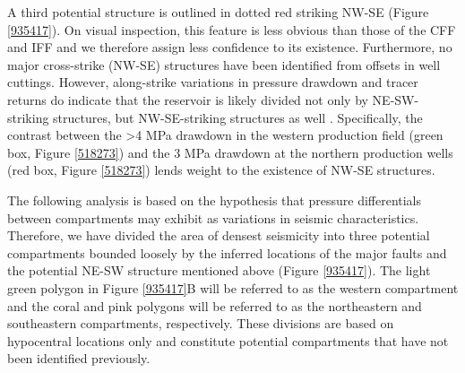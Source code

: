 A third potential structure is outlined in dotted red striking NW-SE (Figure \ref{935417}). On visual inspection, this feature is less obvious than those of the CFF and IFF and we therefore assign less confidence to its existence. Furthermore, no major cross-strike (NW-SE) structures have been identified from offsets in well cuttings. However, along-strike variations in pressure drawdown and tracer returns do indicate that the reservoir is likely divided not only by NE-SW-striking structures, but NW-SE-striking structures as well \citep{Sewell_2015,Quinao_2013stanford}. Specifically, the contrast between the \textgreater4 MPa drawdown in the western production field (green box, Figure \ref{518273}) and the 3 MPa drawdown at the northern production wells (red box, Figure \ref{518273}) lends weight to the existence of NW-SE structures.

The following analysis is based on the hypothesis that pressure differentials between compartments may exhibit as variations in seismic characteristics. Therefore, we have divided the area of densest seismicity into three potential compartments bounded loosely by the inferred locations of the major faults and the potential NE-SW structure mentioned above (Figure \ref{935417}). The light green polygon in Figure \ref{935417}B will be referred to as the western compartment and the coral and pink polygons will be referred to as the northeastern and southeastern compartments, respectively. These divisions are based on hypocentral locations only and constitute potential compartments that have not been identified previously.


